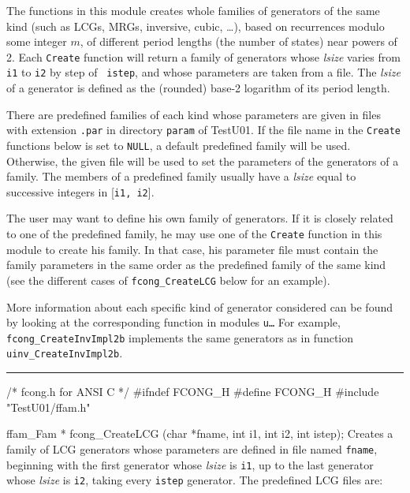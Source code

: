 
The functions in this module creates whole families of generators of the same
kind (such as LCGs, MRGs, inversive, cubic, \ldots), based on recurrences
modulo some integer $m$, of different period lengths (the number of states)
near powers of 2.
Each {\tt Create} function will return a family of generators whose
{\it lsize\/} varies from {\tt i1} to  {\tt i2} by step of {\tt
istep}, and whose parameters are taken from a file.
The {\it lsize\/} of a generator is defined as the (rounded) base-2
logarithm of its period length.

 There are predefined families of each
kind whose parameters are given in files with extension {\tt .par} in
directory {\tt param} of TestU01.
 If the file name in the {\tt Create} functions
below is set to {\tt NULL}, a default predefined family
will be used. Otherwise, the given file will be used to set the parameters
of the generators of a family.
The members of a predefined family usually have a  {\it lsize\/} equal
to successive integers in [{\tt i1, i2}].
%

The user may want to define his own family of generators. If it is closely
related to one of the predefined family, he may use one of the {\tt Create}
function in this module to create his family. In that case, his
parameter file must contain the family parameters in the same order as the
predefined family of the same kind
(see the different cases of {\tt fcong\_CreateLCG} below for an example).

More information about each specific kind of generator considered can
be found by looking at the corresponding function in modules {\tt u\ldots}
For example, {\tt fcong\_CreateInvImpl2b} implements the same generators
as in function {\tt uinv\_CreateInvImpl2b}.


\bigskip
\hrule
\code\hide
/* fcong.h  for ANSI C */
#ifndef FCONG_H
#define FCONG_H
\endhide
#include "TestU01/ffam.h"
\endcode



\code

ffam_Fam * fcong_CreateLCG (char *fname, int i1, int i2, int istep);
\endcode
\tab
 Creates a family of LCG generators whose parameters
 are defined in file named {\tt fname}, beginning with the first
 generator whose {\it lsize\/} is {\tt i1}, up to the last generator whose
 {\it lsize\/} is {\tt i2}, taking every {\tt istep} generator.
 The predefined LCG files are:

